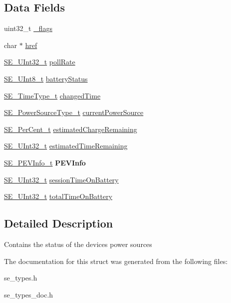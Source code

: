 \subsection*{Data Fields}
\begin{DoxyCompactItemize}
\item 
uint32\+\_\+t \hyperlink{group__PowerStatus_ga89efe1b7a819073171911ffd6befa30a}{\+\_\+flags}
\item 
char $\ast$ \hyperlink{group__PowerStatus_gab2376abd124d3ae0ee8713cc53492976}{href}
\item 
\hyperlink{group__UInt32_ga70bd4ecda3c0c85d20779d685a270cdb}{S\+E\+\_\+\+U\+Int32\+\_\+t} \hyperlink{group__PowerStatus_gaaf69ae89597ebb0d2ea0a5c7d47b404c}{poll\+Rate}
\item 
\hyperlink{group__UInt8_gaf7c365a1acfe204e3a67c16ed44572f5}{S\+E\+\_\+\+U\+Int8\+\_\+t} \hyperlink{group__PowerStatus_ga76bdf536a5aa3eea3495b9a8ca737494}{battery\+Status}
\item 
\hyperlink{group__TimeType_ga6fba87a5b57829b4ff3f0e7638156682}{S\+E\+\_\+\+Time\+Type\+\_\+t} \hyperlink{group__PowerStatus_ga7fc041cacc1e4e6800ef1a1aeb11f3af}{changed\+Time}
\item 
\hyperlink{group__PowerSourceType_ga196e6e180c5421a97062704daa6a96fc}{S\+E\+\_\+\+Power\+Source\+Type\+\_\+t} \hyperlink{group__PowerStatus_gaa8e2324c602131abdb43ccb1aaa88405}{current\+Power\+Source}
\item 
\hyperlink{group__PerCent_ga14278cbee754c63496035b722b417ddc}{S\+E\+\_\+\+Per\+Cent\+\_\+t} \hyperlink{group__PowerStatus_ga32bbe2a8b8b9342158f91cf06b568004}{estimated\+Charge\+Remaining}
\item 
\hyperlink{group__UInt32_ga70bd4ecda3c0c85d20779d685a270cdb}{S\+E\+\_\+\+U\+Int32\+\_\+t} \hyperlink{group__PowerStatus_ga9220ab0a91c90bbbab34cca19884ad81}{estimated\+Time\+Remaining}
\item 
\hyperlink{structSE__PEVInfo__t}{S\+E\+\_\+\+P\+E\+V\+Info\+\_\+t} {\bfseries P\+E\+V\+Info}
\item 
\hyperlink{group__UInt32_ga70bd4ecda3c0c85d20779d685a270cdb}{S\+E\+\_\+\+U\+Int32\+\_\+t} \hyperlink{group__PowerStatus_gac193c010e747194a855b7e0b266c3710}{session\+Time\+On\+Battery}
\item 
\hyperlink{group__UInt32_ga70bd4ecda3c0c85d20779d685a270cdb}{S\+E\+\_\+\+U\+Int32\+\_\+t} \hyperlink{group__PowerStatus_ga06d7be370852bb6cf390fbcc0097a239}{total\+Time\+On\+Battery}
\end{DoxyCompactItemize}


\subsection{Detailed Description}
Contains the status of the device\textquotesingle{}s power sources 

The documentation for this struct was generated from the following files\+:\begin{DoxyCompactItemize}
\item 
se\+\_\+types.\+h\item 
se\+\_\+types\+\_\+doc.\+h\end{DoxyCompactItemize}
